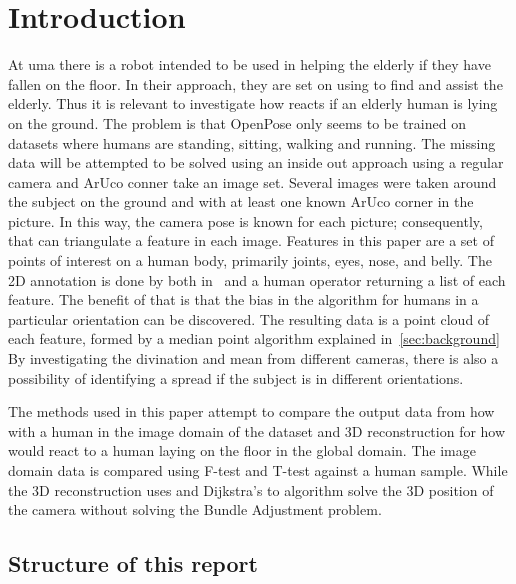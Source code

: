 \section{Introduction}%
\label{sec:intro}
At \ac{uma} there is a robot intended to be used in helping the elderly if they have fallen on the floor.
In their approach, they are set on using \openpose to find and assist the elderly.
Thus it is relevant to investigate how \openpose reacts if an elderly human is lying on the ground.
The problem is that OpenPose only seems to be trained on datasets where humans are standing, sitting, walking and running.
The missing data will be attempted to be solved using an inside out approach using a regular camera and ArUco conner take an image set.
Several images were taken around the subject on the ground and with at least one known ArUco corner in the picture.
In this way, the camera pose is known for each picture; consequently, that can triangulate a feature in each image.
Features in this paper are a set of points of interest on a human body, primarily joints, eyes, nose, and belly.
The 2D annotation is done by both \openpose in~\cite{qiao2017openpose} and a human operator returning a list of each feature.
The benefit of that is that the bias in the \openpose  algorithm for humans in a particular orientation can be discovered.
The resulting data is a point cloud of each feature, formed by a median point algorithm explained in~\ref{sec:background}
By investigating the divination and mean from different cameras, there is also a possibility of identifying a spread if the subject is in different orientations.

The methods used in this paper attempt to compare the output data from how \opnepose with a human in the image domain of the dataset and 3D reconstruction for how \onpepose would react to a human laying on the floor in the global domain.
The image domain data is compared using F-test and T-test against a human sample.
While the 3D reconstruction uses \aruco and Dijkstra's to algorithm solve the 3D position of the camera without solving the Bundle Adjustment problem.

\subsection{Structure of this report}%
\label{sub:Structure_of_this_report}

